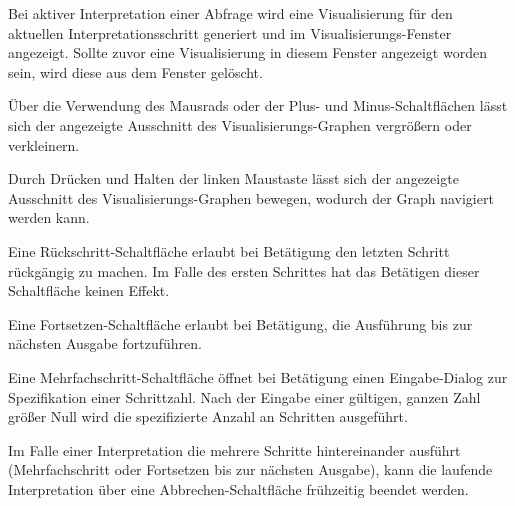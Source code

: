 \documentclass[parskip=full,11pt,twoside]{scrartcl}
\begin{document}

Bei aktiver Interpretation einer Abfrage wird eine Visualisierung für den aktuellen Interpretationsschritt generiert und im Visualisierungs-Fenster angezeigt. Sollte zuvor eine Visualisierung in diesem Fenster angezeigt worden sein, wird diese aus dem Fenster gelöscht.


Über die Verwendung des Mausrads oder der Plus- und Minus-Schaltflächen lässt sich der angezeigte Ausschnitt des Visualisierungs-Graphen vergrößern oder verkleinern.


Durch Drücken und Halten der linken Maustaste lässt sich der angezeigte Ausschnitt des Visualisierungs-Graphen bewegen, wodurch der Graph navigiert werden kann.


Eine Rückschritt-Schaltfläche erlaubt bei Betätigung den letzten Schritt rückgängig zu machen. Im Falle des ersten Schrittes hat das Betätigen dieser Schaltfläche keinen Effekt.


Eine Fortsetzen-Schaltfläche erlaubt bei Betätigung, die Ausführung bis zur nächsten Ausgabe fortzuführen.


Eine Mehrfachschritt-Schaltfläche öffnet bei Betätigung einen Eingabe-Dialog zur Spezifikation einer Schrittzahl. Nach der Eingabe einer gültigen, ganzen Zahl größer Null wird die spezifizierte Anzahl an Schritten ausgeführt.


Im Falle einer Interpretation die mehrere Schritte hintereinander ausführt (Mehrfachschritt oder Fortsetzen bis zur nächsten Ausgabe), kann die laufende Interpretation über eine Abbrechen-Schaltfläche frühzeitig beendet werden.
\end{document}
